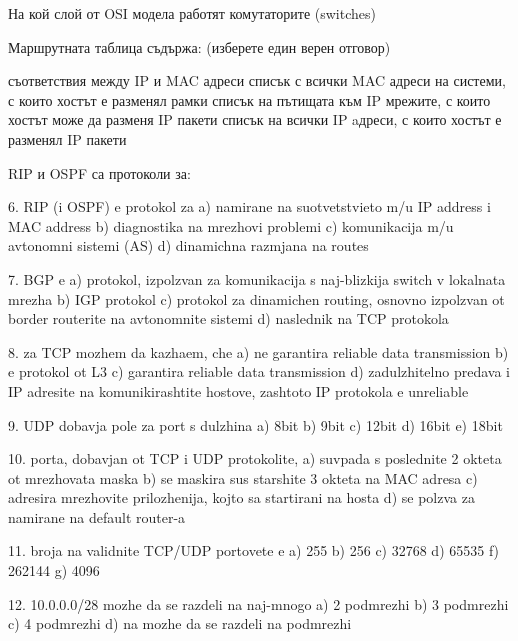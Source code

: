 \begin{questions}
  \question[6] На кой слой от OSI модела работят комутаторите
  (\foreignlanguage{english}{switches})

  \begin{oneparchoices}
  \end{oneparchoices}

  \question[6] Маршрутната таблица съдържа: (изберете един верен отговор)
  \begin{choices}
    \choice съответствия между IP и MAC адреси
    \choice списък с всички MAC адреси на системи, с които хостът е разменял
    рамки
    \CorrectChoice списък на пътищата към IP мрежите, с които хостът може да
    разменя IP пакети
    \choice списък на всички IP aдреси, с които хостът е разменял IP пакети
  \end{choices}

  \question[6] RIP и OSPF са протоколи за:
  \begin{choices}
    \choice 
  \end{choices}

6. RIP (i OSPF) e protokol za
a) namirane na suotvetstvieto m/u IP address i MAC address
b) diagnostika na mrezhovi problemi
c) komunikacija m/u avtonomni sistemi (AS)
d) dinamichna razmjana na routes

7. BGP e
a) protokol, izpolzvan za komunikacija s naj-blizkija switch v lokalnata mrezha
b) IGP protokol
c) protokol za dinamichen routing, osnovno izpolzvan ot border routerite na avtonomnite sistemi
d) naslednik na TCP protokola

8. za TCP mozhem da kazhaem, che
a) ne garantira reliable data transmission
b) e protokol ot L3
c) garantira reliable data transmission
d) zadulzhitelno predava i IP adresite na komunikirashtite hostove, zashtoto IP protokola e unreliable

9. UDP dobavja pole za port s dulzhina
a) 8bit
b) 9bit
c) 12bit
d) 16bit
e) 18bit

10. porta, dobavjan ot TCP i UDP protokolite,
a) suvpada s poslednite 2 okteta ot mrezhovata maska
b) se maskira sus starshite 3 okteta na MAC adresa
c) adresira mrezhovite prilozhenija, kojto sa startirani na hosta
d) se polzva za namirane na default router-a

11. broja na validnite TCP/UDP portovete e
a) 255
b) 256
c) 32768
d) 65535
f) 262144
g) 4096

12. 10.0.0.0/28 mozhe da se razdeli na naj-mnogo
a) 2 podmrezhi
b) 3 podmrezhi
c) 4 podmrezhi
d) na mozhe da se razdeli na podmrezhi


\end{questions}
